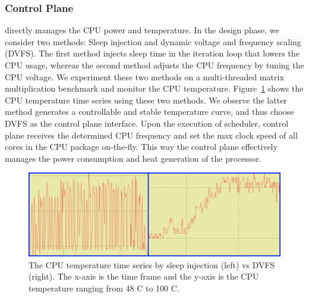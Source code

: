 \subsubsection{Control Plane}
directly manages the CPU power and temperature. In the design phase, we consider two methods: Sleep injection and dynamic voltage and frequency scaling (DVFS). The first method injects sleep time in the iteration loop that lowers the CPU usage, whereas the second method adjusts the CPU frequency by tuning the CPU voltage. We experiment these two methods on a multi-threaded matrix multiplication benchmark and monitor the CPU temperature. Figure~\ref{fig:sleep} shows the CPU temperature time series using these two methods. We observe the latter method generates a controllable and stable temperature curve, and thus choose DVFS as the control plane interface. Upon the execution of scheduler, control plane receives the determined CPU frequency and set the max clock speed of all cores in the CPU package on-the-fly. This way the control plane effectively manages the power consumption and heat generation of the processor.

\begin{figure}
\includegraphics[width=\textwidth]{figures/Sleep-vs-dvfs.png}
\caption{The CPU temperature time series by sleep injection (left) vs DVFS (right). The x-axis is the time frame and the y-axis is the CPU temperature ranging from 48 \degree C to 100 \degree C. } \label{fig:sleep}
\end{figure}


